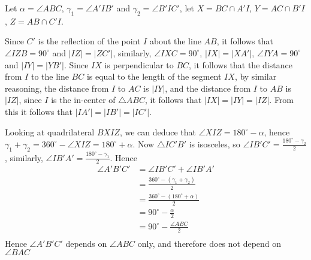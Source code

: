 \documentclass[11pt]{article}
\begin{document}
Let $\alpha=\angle ABC$, $\gamma_1=\angle A'IB'$ and $\gamma_2=\angle B'IC'$, let $X=BC\cap A'I$, $Y=AC\cap B'I$, $Z=AB\cap C'I$. 

Since $C'$ is the reflection of the point $I$ about the line $AB$, it follows that $\angle IZB=90^\circ$ and $|IZ|=|ZC'|$, similarly, $\angle IXC=90^\circ$, $|IX|=|XA'|$, $\angle IYA=90^\circ$ and $|IY|=|YB'|$. Since $IX$ is perpendicular to $BC$, it follows that the distance from $I$ to the line $BC$ is equal to the length of the segment $IX$, by similar reasoning, the distance from $I$ to $AC$ is $|IY|$, and the distance from $I$ to $AB$ is $|IZ|$, since $I$ is the in-center of $\triangle ABC$, it follows that $|IX|=|IY|=|IZ|$. From this it follows that $|IA'|=|IB'|=|IC'|$.

Looking at quadrilateral $BXIZ$, we can deduce that $\angle XIZ=180^\circ-\alpha$, hence $\gamma_1+\gamma_2=360^\circ-\angle XIZ=180^\circ+\alpha$. Now $\triangle IC'B'$ is isosceles, so $\angle IB'C'=\displaystyle\frac{180^\circ-\gamma_2}{2}$, similarly, $\angle IB'A'=\displaystyle\frac{180^\circ-\gamma_1}{2}$. Hence
\begin{align*}
	\angle A'B'C'&=\angle IB'C'+\angle IB'A'\\
	&=\frac{360^\circ-(\gamma_1+\gamma_2)}{2}\\
	&=\frac{360^\circ-(180^\circ+\alpha)}{2}\\
	&=90^\circ-\frac{\alpha}{2}\\
	&=90^\circ-\frac{\angle ABC}{2}\\
\end{align*}
Hence $\angle A'B'C'$ depends on $\angle ABC$ only, and therefore does not depend on $\angle BAC$
\end{document}
